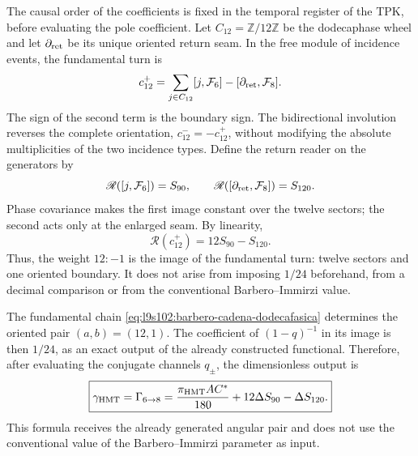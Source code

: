 The causal order of the coefficients is fixed in the temporal register of the TPK,
before evaluating the pole coefficient. Let \(C_{12}=\mathbb Z/12\mathbb Z\) be the dodecaphase
wheel and let \(\partial_{\rm ret}\) be its unique oriented return seam.
In the free module of incidence events, the fundamental turn is
\begin{equation}
 c_{12}^{+}
 =\sum_{j\in C_{12}}[j,\mathcal F_6]
  -[\partial_{\rm ret},\mathcal F_8].
 \label{eq:l9s102:barbero-cadena-dodecafasica}
\end{equation}
The sign of the second term is the boundary sign. The bidirectional
involution reverses the complete orientation,
\(c_{12}^{-}=-c_{12}^{+}\), without modifying the absolute multiplicities of
the two incidence types. Define the return reader on the
generators by
\begin{equation}
 \mathscr R([j,\mathcal F_6])=S_{90},
 \qquad
 \mathscr R([\partial_{\rm ret},\mathcal F_8])=S_{120}.
 \label{eq:l9s102:barbero-lector-retorno}
\end{equation}
Phase covariance makes the first image constant over the twelve
sectors; the second acts only at the enlarged seam. By linearity,
\begin{equation}
 \boxed{\mathscr R(c_{12}^{+})=12S_{90}-S_{120}.}
 \label{eq:l9s102:barbero-peso-generado}
\end{equation}
Thus, the weight \(12:-1\) is the image of the fundamental turn: twelve sectors and
one oriented boundary. It does not arise from imposing \(1/24\) beforehand, from a
decimal comparison or from the conventional Barbero--Immirzi value.

\begin{theorem}
\label{thm:l9s102:barbero-funcional}
The fundamental chain \eqref{eq:l9s102:barbero-cadena-dodecafasica} determines
the oriented pair \((a,b)=(12,1)\). The coefficient of \((1-q)^{-1}\) in its image is
then \(1/24\), as an exact output of the already constructed functional. Therefore,
after evaluating the conjugate channels \(q_\pm\), the dimensionless output is
\begin{equation}
 \boxed{
 \gamma_{\rm HMT}=\Gamma_{6\to8}
 =\frac{\pi_{\rm HMT}AC^*}{180}
   +12\Delta S_{90}-\Delta S_{120}.}
 \label{eq:l9s102:barbero-gamma}
\end{equation}
This formula receives the already generated angular pair and does not use
 the conventional value of the Barbero--Immirzi parameter as input.
\end{theorem}

